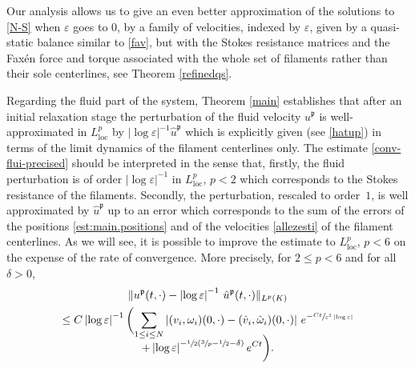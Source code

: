 \documentclass[11pt]{article}
\let\eps\varepsilon
\newcommand{\loc}{\mathrm{loc}}
\theoremstyle{definition}
\theoremstyle{remark}
\begin{document}
Our analysis allows us to give an even better approximation of the solutions to \eqref{N-S} when $\eps$ goes to $0$,
by a family of velocities, indexed by $\eps$, given by a quasi-static balance similar to \eqref{fav}, but with the Stokes resistance matrices and the Faxén force and torque
associated with the whole set of filaments rather than their sole centerlines, see Theorem \ref{refinedqs}.

Regarding the fluid part of the system, Theorem \ref{main} establishes that
after an initial relaxation stage the perturbation of the fluid velocity ${u}^\mathfrak{p}$ is well-approximated in $L^p_\loc$ by $\left|\log \eps\right|^{-1} \hat {u}^\mathfrak{p}$ which is explicitly given (see \eqref{hatup}) in terms of the limit dynamics of the filament centerlines only. The estimate
\eqref{conv-flui-precised} should be interpreted in the sense that, firstly, the fluid perturbation is of order $\left|\log \eps\right|^{-1}$ in $L^p_\loc$, $p<2$ which corresponds to the Stokes resistance of the filaments. Secondly, the perturbation, rescaled to order~$1$, is well approximated by $ \hat {u}^\mathfrak{p}$ up to an error which corresponds to the sum of the errors of the positions \eqref{est:main.positions} and of the velocities \eqref{allezesti} of the filament centerlines.
As we will see, it is possible to improve the estimate to $L^p_\loc$, $p< 6$ on the expense of the rate of convergence. More precisely, for $2 \leq p < 6$ and for all $\delta > 0$,
\begin{multline}
\label{conv-flui-precised.comment}
\| u^\mathfrak{p}(t,\cdot) - \left|\log \eps\right|^{-1} \, {\hat u}^\mathfrak{p} (t,\cdot) \|_{L^p (K) } \\
\leq
C \left|\log \eps\right|^{-1} \biggl(\sum_{1 \leq i \leq N} \left| (\textrm{v}_i,\omega_i) (0,\cdot) - (\hat{\textrm{v}}_i,{\hat \omega}_i)(0,\cdot)
\right| \, e^{- \sfrac{C t}{\eps^2 \left|\log \eps\right|}}\\[-8pt]
+ \left|\log \eps\right|^{-\sfrac 1 2(\sfrac 3 p - \sfrac 1 2 - \delta)} e^{C t} \biggr).
\end{multline}
\end{document}
